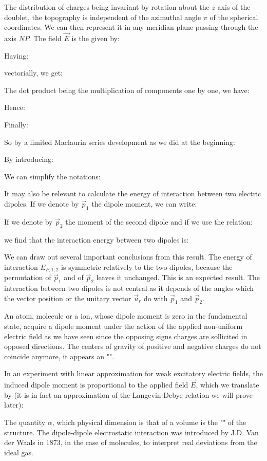 	The distribution of charges being invariant by rotation about the $z$ axis of the doublet, the topography is independent of the azimuthal angle $\pi$ of the spherical coordinates. We can then represent it in any meridian plane passing through the axis $NP$. The field $\vec{E}$ is the given by:
	
	Having:
	
	vectorially, we get:
	
	The dot product being the multiplication of components one by one, we have:
	
	Hence:
	
	Finally:
	
	So by a limited Maclaurin series development as we did at the beginning:
	
	By introducing:
	
	We can simplify the notations:
	
	It may also be relevant to calculate the energy of interaction between two electric dipoles. If we denote by $\vec{p}_1$ the dipole moment, we can write:
	
	If we denote by $\vec{p}_2$ the moment of the second dipole and if we use the relation:
	
	we find that the interaction energy between two dipoles is:
	
	We can draw out several important conclusions from this result. The energy of interaction $E_{P,1,2}$ is symmetric relatively to the two dipoles, because the permutation of $\vec{p}_1$ and of $\vec{p}_2$ leaves it unchanged. This is an expected result. The interaction between two dipoles is not central as it depends of the angles which the vector position or the unitary vector $\vec{u}_r$ do with $\vec{p}_1$ and $\vec{p}_2$.
	
	An atom, molecule or a ion, whose dipole moment is zero in the fundamental state, acquire a dipole moment under the action of the applied non-uniform electric field as we have seen since the opposing signs charges are sollicited in opposed directions. The centers of gravity of positive and negative charges do not coincide anymore, it appears an "". 

	In an experiment with linear approximation for weak excitatory electric fields, the induced dipole moment is proportional to the applied field $\vec{E}$, which we translate by  (it is in fact an approximation of the Langevin-Debye relation we will prove later):
	
	The quantity $\alpha$, which physical dimension is that of a volume is the "" of the structure. The dipole-dipole electrostatic interaction was introduced by J.D. Van der Waals in 1873, in the case of molecules, to interpret real deviations from the ideal gas.
	
